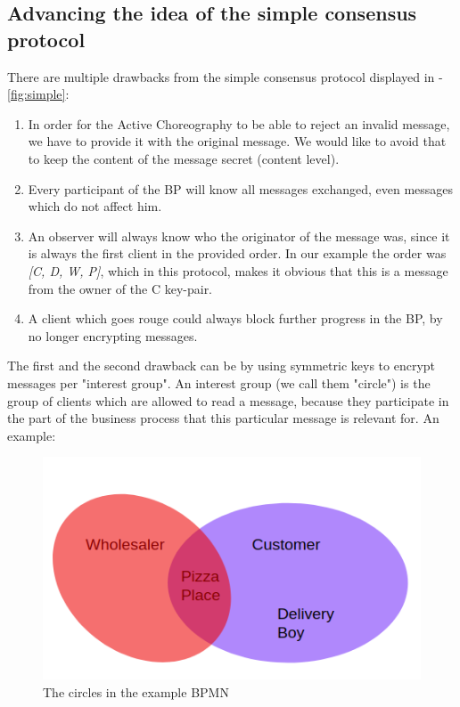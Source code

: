 \documentclass[runningheads]{llncs}
\begin{document}
\subsection{Advancing the idea of the simple consensus protocol}

There are multiple drawbacks from the simple consensus protocol displayed in -\ref{fig:simple}: 

\begin{enumerate}
    \item In order for the Active Choreography to be able to reject an invalid message, we have to provide it with the original message. We would like to avoid that to keep the content of the message secret (content level).
    \item Every participant of the BP will know all messages exchanged, even messages which do not affect him. 
    \item An observer will always know who the originator of the message was, since it is always the first client in the provided order. In our example the order was \textit{[C, D, W, P]}, which in this protocol, makes it obvious that this is a message from the owner of the C key-pair.
    \item A client which goes rouge could always block further progress in the BP, by no longer encrypting messages.
\end{enumerate}

The first and the second drawback can be by using symmetric keys to encrypt messages per "interest group". An interest group (we call them "circle") is the group of clients which are allowed to read a message, because they participate in the part of the business process that this particular message is relevant for. An example: 

\begin{figure}
    \centering
    \includegraphics[scale=0.6]{cicles.png}
    \caption{The circles in the example BPMN}
    \label{fig:circle}
\end{figure}
\end{document}

